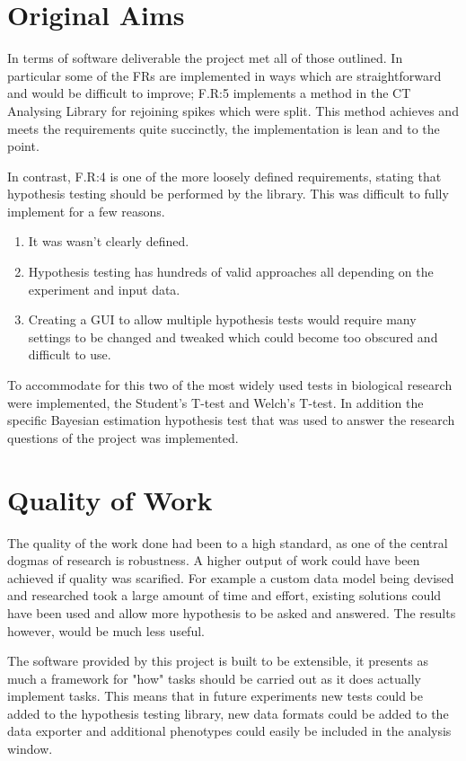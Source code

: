 \documentclass[11pt]{report}
\begin{document}
\section{Original Aims}
\label{sec:org0798658}
In terms of software deliverable the project met all of those outlined. In particular some of the FRs are implemented in ways which are straightforward and would be difficult to improve; F.R:5 implements a method in the CT Analysing Library for rejoining spikes which were split. This method achieves and meets the requirements quite succinctly, the implementation is lean and to the point.

In contrast, F.R:4 is one of the more loosely defined requirements, stating that hypothesis testing should be performed by the library. This was difficult to fully implement for a few reasons.

\begin{enumerate}
\item It was wasn't clearly defined.
\item Hypothesis testing has hundreds of valid approaches all depending on the experiment and input data.
\item Creating a GUI to allow multiple hypothesis tests would require many settings to be changed and tweaked which could become too obscured and difficult to use.
\end{enumerate}

To accommodate for this two of the most widely used tests in biological research were implemented, the Student's T-test and Welch's T-test. In addition the specific Bayesian estimation hypothesis test that was used to answer the research questions of the project was implemented.


\section{Quality of Work}
\label{sec:org9834ebd}
The quality of the work done had been to a high standard, as one of the central dogmas of research is robustness. A higher output of work could have been achieved if quality was scarified. For example a custom data model being devised and researched took a large amount of time and effort, existing solutions could have been used and allow more hypothesis to be asked and answered. The results however, would be much less useful.

The software provided by this project is built to be extensible, it presents as much a framework for "how" tasks should be carried out as it does actually implement tasks. This means that in future experiments new tests could be added to the hypothesis testing library, new data formats could be added to the data exporter and additional phenotypes could easily be included in the analysis window.
\end{document}
